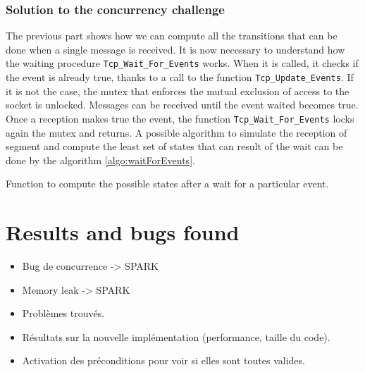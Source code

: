 \documentclass[runningheads]{llncs}
\begin{document}
\subsubsection{Solution to the concurrency challenge}

    The previous part shows how we can compute all the transitions that can be done when a single message is received.
    It is now necessary to understand how the waiting procedure \lstinline{Tcp_Wait_For_Events} works.
    When it is called, it checks if the event is already true, thanks to a call to the function \lstinline{Tcp_Update_Events}.
    If it is not the case, the mutex that enforces the mutual exclusion of access to the socket is unlocked.
    Messages can be received until the event waited becomes true.
    Once a reception makes true the event, the function \lstinline{Tcp_Wait_For_Events} locks again the mutex and returns.
    A possible algorithm to simulate the reception of segment and compute the least set of states that can result of the wait can be done
    by the algorithm \ref{algo:waitForEvents}.

    \begin{algorithm}
        \caption{Function to compute the possible states after a wait for a particular event.}
        \label{algo:waitForEvents}
    \end{algorithm}

\section{Results and bugs found}
\label{sec:results}

    \begin{itemize}
        \item Bug de concurrence -> SPARK
        \item Memory leak -> SPARK
        \item Problèmes trouvés.
        \item Résultats sur la nouvelle implémentation (performance, taille du code).
        \item Activation des préconditions pour voir si elles sont toutes valides.
    \end{itemize}
\end{document}
